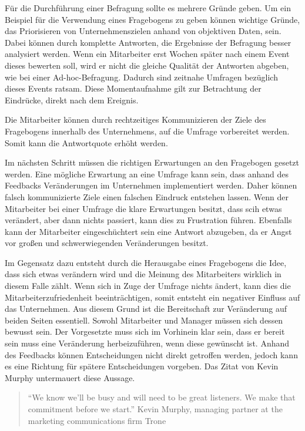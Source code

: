 Für die Durchführung einer Befragung sollte es mehrere Gründe geben. 
Um ein Beispiel für die Verwendung eines Fragebogens zu geben können wichtige Gründe, das Priorisieren von Unternehmenszielen anhand von objektiven Daten, sein. 
Dabei können durch komplette Antworten, die Ergebnisse der Befragung besser analysiert werden. 
Wenn ein Mitarbeiter erst Wochen später nach einem Event dieses bewerten soll, wird er nicht die gleiche Qualität der Antworten abgeben, wie bei einer Ad-hoc-Befragung.
Dadurch sind zeitnahe Umfragen bezüglich dieses Events ratsam. 
Diese Momentaufnahme gilt zur Betrachtung der Eindrücke, direkt nach dem Ereignis.

Die Mitarbeiter können durch rechtzeitiges Kommunizieren der Ziele des Fragebogens innerhalb des Unternehmens, auf die Umfrage vorbereitet werden. 
Somit kann die Antwortquote erhöht werden. 

Im nächsten Schritt müssen die richtigen Erwartungen an den Fragebogen gesetzt werden. 
Eine mögliche Erwartung an eine Umfrage kann sein, dass anhand des Feedbacks Veränderungen im Unternehmen implementiert werden. 
Daher können falsch kommunizierte Ziele einen falschen Eindruck entstehen lassen.
Wenn der Mitarbeiter bei einer Umfrage die klare Erwartungen besitzt, dass scih etwas verändert, aber dann nichts passiert, kann dies zu Frustration führen.
Ebenfalls kann der Mitarbeiter eingeschüchtert sein eine Antwort abzugeben, da er Angst vor großen und schwerwiegenden Veränderungen besitzt\autocite[Chapter 3
Setting Expectations]{Perfect}.

Im Gegensatz dazu entsteht durch die Herausgabe eines Fragebogens die Idee, dass sich etwas verändern wird und die Meinung des Mitarbeiters wirklich in diesem Falle zählt.
Wenn sich in Zuge der Umfrage nichts ändert, kann dies die Mitarbeiterzufriedenheit beeinträchtigen, somit entsteht ein negativer Einfluss auf das Unternehmen.
Aus diesem Grund ist die Bereitschaft zur Veränderung auf beiden Seiten essentiell. 
Sowohl Mitarbeiter und Manager müssen sich dessen bewusst sein.
Der Vorgesetzte muss sich im Vorhinein klar sein, dass er bereit sein muss eine Veränderung herbeizuführen, wenn diese gewünscht ist.
Anhand des Feedbacks können Entscheidungen nicht direkt getroffen werden, jedoch kann es eine Richtung für spätere Entscheidungen vorgeben. 
Das Zitat von Kevin Murphy untermauert diese Aussage\autocite[Chapter 3
Setting Expectations]{Perfect}.
\begin{quote} \enquote{We know we’ll be busy and will need to be great listeners. We make that commitment before we start.} Kevin Murphy, managing partner at the marketing communications firm Trone \end{quote}

